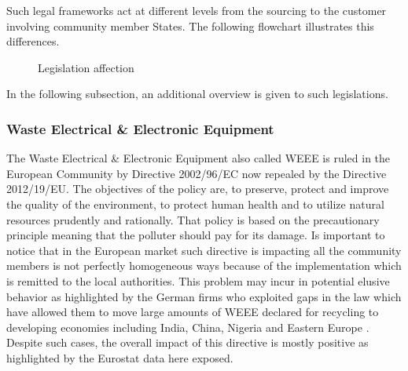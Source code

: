 \begin{doublespace}
  Such legal frameworks act at different levels from the sourcing to the customer involving community member States. The following flowchart illustrates this differences.

  \begin{figure}[ht]
    \centering

    \caption{Legislation affection}
  \end{figure}

  In the following subsection, an additional overview is given to such legislations.

\subsubsection{Waste Electrical \& Electronic Equipment}
  The Waste Electrical \& Electronic Equipment also called WEEE is ruled in the European Community by Directive 2002/96/EC now repealed by the Directive 2012/19/EU. The objectives of the policy are, to preserve, protect and improve the quality of the environment, to protect human health and to utilize natural resources prudently and rationally. That policy is based on the precautionary principle meaning that the polluter should pay for its damage. Is important to notice that in the European market such directive is impacting all the community members is not perfectly homogeneous ways because of the implementation which is remitted to the local authorities. This problem may incur in potential elusive behavior as highlighted by the German firms who exploited gaps in the law which have allowed them to move large amounts of WEEE declared for recycling to developing economies including India, China, Nigeria and Eastern Europe \cite{Ongondo2011}. Despite such cases, the overall impact of this directive is mostly positive as highlighted by the Eurostat data here exposed.


\end{doublespace}
